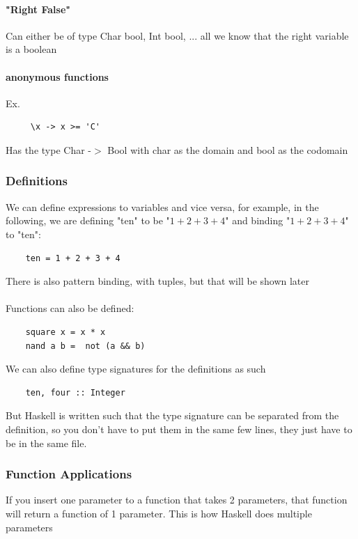 \documentclass[12pt]{article}
\begin{document}
\paragraph{"Right False"} Can either be of type Char bool, Int bool, ... all we know that the right variable is a boolean

\paragraph{anonymous functions} Ex.

\begin{lstlisting}
	 \x -> x >= 'C'
\end{lstlisting}

Has the type Char -$>$ Bool with char as the domain and bool as the codomain

\subsubsection{Definitions}

We can define expressions to variables and vice versa, for example, in the following, we are defining "ten" to be "$1+2+3+4$" and binding "$1+2+3+4$" to "ten":
\begin{lstlisting}
	ten = 1 + 2 + 3 + 4
\end{lstlisting}

There is also pattern binding, with tuples, but that will be shown later\\
\\
Functions can also be defined:

\begin{lstlisting}
	square x = x * x
	nand a b =  not (a && b)
\end{lstlisting}

We can also define type signatures for the definitions as such

\begin{lstlisting}
	ten, four :: Integer
\end{lstlisting}

But Haskell is written such that the type signature can be separated from the definition, so you don't have to put them in the same few lines, they just have to be in the same file.

\subsubsection{Function Applications}

If you insert one parameter to a function that takes 2 parameters, that function will return a function of 1 parameter. This is how Haskell does multiple parameters
\end{document}
